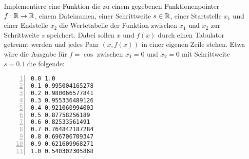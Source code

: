 \begin{aufg} Implementiere eine Funktion die zu einem gegebenen Funktionenpointer $f:\mathbb{R} \rightarrow \mathbb{R}$, einem Dateinamen, einer Schrittweite $s \in \mathbb{R}$, einer Startstelle $x_1$ und einer Endstelle $x_2$ die Wertetabelle der Funktion zwischen $x_1$ und $x_2$ zur Schrittweite $s$ speichert. Dabei sollen $x$ und $f(x)$ durch einen Tabulator getrennt werden und jedes Paar $(x, f(x))$ in einer eigenen Zeile stehen. Etwa wäre die Ausgabe für $f=\cos$ zwischen $x_1=0$ und $x_2=0$ mit Schrittweite $s=0.1$ die folgende:
\begin{codelisting}
\begin{lstlisting}[numbers=left,numberstyle=\tiny,frame=tlrb]
0.0 1.0
0.1 0.995004165278
0.2 0.980066577841
0.3 0.955336489126
0.4 0.921060994003
0.5 0.87758256189
0.6 0.82533561491
0.7 0.764842187284
0.8 0.696706709347
0.9 0.621609968271
1.0 0.540302305868
\end{lstlisting}
\end{codelisting}
\end{aufg}

